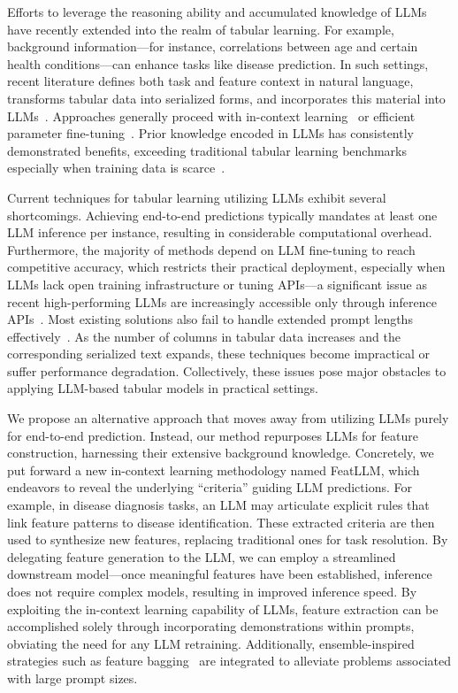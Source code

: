 Efforts to leverage the reasoning ability and accumulated knowledge of LLMs have recently extended into the realm of tabular learning. For example, background information—for instance, correlations between age and certain health conditions—can enhance tasks like disease prediction. In such settings, recent literature defines both task and feature context in natural language, transforms tabular data into serialized forms, and incorporates this material into LLMs~\cite{dinh2022lift,wang2023anypredict}. Approaches generally proceed with in-context learning~\cite{nam2023semi} or efficient parameter fine-tuning~\cite{dinh2022lift,hegselmann2023tabllm}. Prior knowledge encoded in LLMs has consistently demonstrated benefits, exceeding traditional tabular learning benchmarks especially when training data is scarce~\cite{hegselmann2023tabllm}.

Current techniques for tabular learning utilizing LLMs exhibit several shortcomings. Achieving end-to-end predictions typically mandates at least one LLM inference per instance, resulting in considerable computational overhead. Furthermore, the majority of methods depend on LLM fine-tuning to reach competitive accuracy, which restricts their practical deployment, especially when LLMs lack open training infrastructure or tuning APIs—a significant issue as recent high-performing LLMs are increasingly accessible only through inference APIs~\cite{anil2023palm,openai2023gpt4}. Most existing solutions also fail to handle extended prompt lengths effectively~\cite{liu2023lost}. As the number of columns in tabular data increases and the corresponding serialized text expands, these techniques become impractical or suffer performance degradation. Collectively, these issues pose major obstacles to applying LLM-based tabular models in practical settings.

We propose an alternative approach that moves away from utilizing LLMs purely for end-to-end prediction. Instead, our method repurposes LLMs for feature construction, harnessing their extensive background knowledge. Concretely, we put forward a new in-context learning methodology named \textsf{FeatLLM}, which endeavors to reveal the underlying “criteria” guiding LLM predictions. For example, in disease diagnosis tasks, an LLM may articulate explicit rules that link feature patterns to disease identification. These extracted criteria are then used to synthesize new features, replacing traditional ones for task resolution. By delegating feature generation to the LLM, we can employ a streamlined downstream model—once meaningful features have been established, inference does not require complex models, resulting in improved inference speed. By exploiting the in-context learning capability of LLMs, feature extraction can be accomplished solely through incorporating demonstrations within prompts, obviating the need for any LLM retraining. Additionally, ensemble-inspired strategies such as feature bagging~\cite{breiman2001random} are integrated to alleviate problems associated with large prompt sizes.

